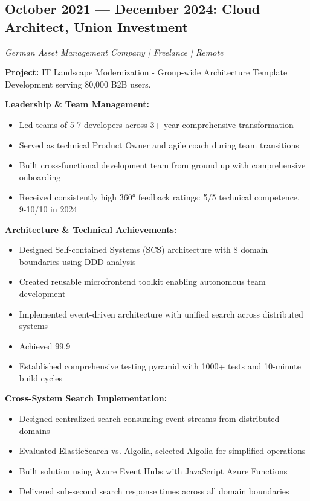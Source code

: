 \documentclass[11pt,a4paper]{article}
\begin{document}
\subsection{October 2021 — December 2024: Cloud Architect, Union Investment}
\textit{German Asset Management Company | Freelance | Remote}

\textbf{Project:} IT Landscape Modernization - Group-wide Architecture Template Development serving 80,000 B2B users.

\textbf{Leadership \& Team Management:}
\begin{itemize}[leftmargin=12pt,topsep=0pt,itemsep=0pt]
\item Led teams of 5-7 developers across 3+ year comprehensive transformation
\item Served as technical Product Owner and agile coach during team transitions
\item Built cross-functional development team from ground up with comprehensive onboarding
\item Received consistently high 360° feedback ratings: 5/5 technical competence, 9-10/10 in 2024
\end{itemize}

\textbf{Architecture \& Technical Achievements:}
\begin{itemize}[leftmargin=12pt,topsep=0pt,itemsep=0pt]
\item Designed Self-contained Systems (SCS) architecture with 8 domain boundaries using DDD analysis
\item Created reusable microfrontend toolkit enabling autonomous team development
\item Implemented event-driven architecture with unified search across distributed systems
\item Achieved 99.9%
\item Established comprehensive testing pyramid with 1000+ tests and 10-minute build cycles
\end{itemize}

\textbf{Cross-System Search Implementation:}
\begin{itemize}[leftmargin=12pt,topsep=0pt,itemsep=0pt]
\item Designed centralized search consuming event streams from distributed domains
\item Evaluated ElasticSearch vs. Algolia, selected Algolia for simplified operations
\item Built solution using Azure Event Hubs with JavaScript Azure Functions
\item Delivered sub-second search response times across all domain boundaries
\end{itemize}
\end{document}
